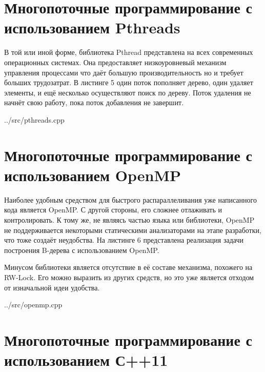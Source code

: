 \documentclass[a4paper, 12pt]{report}		%
\begin{document}
\chapter*{Многопоточные программирование с использованием Pthreads}

В той или иной форме, библиотека Pthread представлена на всех современных операционных системах. Она предоставляет низкоуровневый механизм управления процессами что даёт большую производительность но и требует больших трудозатрат. В листинге 5 один поток пополняет дерево, один удаляет элементы, и ещё несколько осуществляют поиск по дереву. Поток удаления не начнёт свою работу, пока поток добавления не завершит.


{../src/pthreads.cpp}


\chapter*{Многопоточные программирование с использованием OpenMP}

Наиболее удобным средством для быстрого распараллеливания уже написанного кода является OpenMP. С другой стороны, его сложнее отлаживать и контролировать. К тому же, не являясь частью языка или библиотеки, OpenMP не поддерживается некоторыми статическими анализаторами на этапе разработки, что тоже создаёт неудобства. На листинге 6 представлена реализация задачи построения B-дерева с использованием OpenMP.

Минусом библиотеки является отсутствие в её составе механизма, похожего на RW-Lock. Его можно выразить из других средств, но это уже является отходом от изначальной идеи удобства.


{../src/openmp.cpp}


\chapter*{Многопоточные программирование с использованием С++11}
\end{document}
